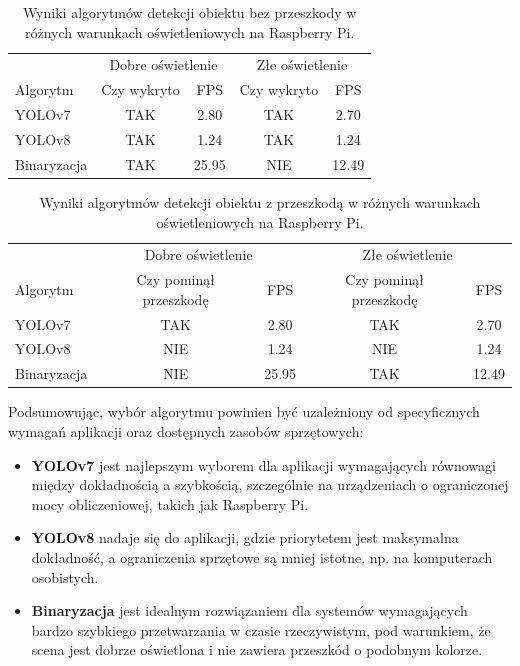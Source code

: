\documentclass[a4paper,twoside,12pt]{book}
\begin{document}
\begin{table}[h!]
    \centering
    \caption{Wyniki algorytmów detekcji obiektu bez przeszkody w różnych warunkach oświetleniowych na Raspberry Pi.}
    \label{tab:bez_przeszkody_rpi}
    \begin{tabular}{lcccc}
    \toprule
     & \multicolumn{2}{c}{Dobre oświetlenie} & \multicolumn{2}{c}{Złe oświetlenie} \\
    \cmidrule(r){2-3} \cmidrule(r){4-5}
    Algorytm & Czy wykryto & FPS & Czy wykryto & FPS \\
    \midrule
    YOLOv7 & TAK & 2.80 & TAK & 2.70 \\
    YOLOv8 & TAK & 1.24 & TAK & 1.24 \\
    Binaryzacja & TAK & 25.95 & NIE & 12.49 \\
    \bottomrule
    \end{tabular}
\end{table}

\begin{table}[h!]
    \centering
    \caption{Wyniki algorytmów detekcji obiektu z przeszkodą w różnych warunkach oświetleniowych na Raspberry Pi.}
    \label{tab:z_przeszkoda_rpi}
    \begin{tabular}{lcccc}
    \toprule
     & \multicolumn{2}{c}{Dobre oświetlenie} & \multicolumn{2}{c}{Złe oświetlenie} \\
    \cmidrule(r){2-3} \cmidrule(r){4-5}
    Algorytm & Czy pominął przeszkodę & FPS & Czy pominął przeszkodę & FPS \\
    \midrule
    YOLOv7 & TAK & 2.80 & TAK & 2.70 \\
    YOLOv8 & NIE & 1.24 & NIE & 1.24 \\
    Binaryzacja & NIE & 25.95 & TAK & 12.49 \\
    \bottomrule
    \end{tabular}
\end{table}

Podsumowując, wybór algorytmu powinien być uzależniony od specyficznych wymagań aplikacji oraz dostępnych zasobów sprzętowych:
\begin{itemize}
    \item \textbf{YOLOv7} jest najlepszym wyborem dla aplikacji wymagających równowagi między dokładnością a szybkością, szczególnie na urządzeniach o ograniczonej mocy obliczeniowej, takich jak Raspberry Pi.
    \item \textbf{YOLOv8} nadaje się do aplikacji, gdzie priorytetem jest maksymalna dokładność, a ograniczenia sprzętowe są mniej istotne, np. na komputerach osobistych.
    \item \textbf{Binaryzacja} jest idealnym rozwiązaniem dla systemów wymagających bardzo szybkiego przetwarzania w czasie rzeczywistym, pod warunkiem, że scena jest dobrze oświetlona i nie zawiera przeszkód o podobnym kolorze.
\end{itemize}
\end{document}
